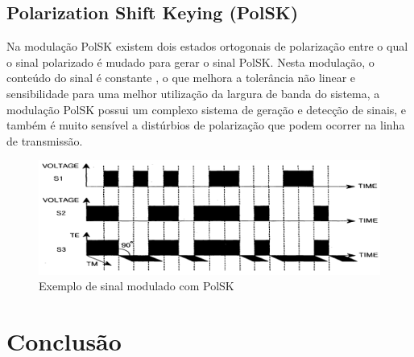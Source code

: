 \documentclass[article]{IEEEtran}
\begin{document}
\subsection{Polarization Shift Keying (PolSK)}
Na modulação PolSK existem dois estados ortogonais de polarização entre o qual o sinal polarizado é mudado para gerar o sinal PolSK. Nesta modulação, o conteúdo do sinal é constante , o que melhora a tolerância não linear e sensibilidade para uma melhor utilização da largura de banda do sistema, a modulação PolSK possui um complexo sistema de geração e detecção de sinais, e também é muito sensível a distúrbios de polarização que podem ocorrer na linha de transmissão.
\begin{figure}[h]
\includegraphics[width=\columnwidth]{polsk.png}
\caption{Exemplo de sinal modulado com PolSK}
\end{figure}
\section{Conclusão}
\end{document}
